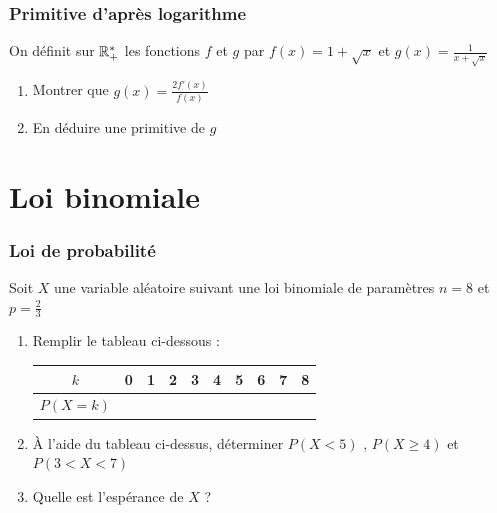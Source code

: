 \documentclass[oneside,12pt]{book}          %
\begin{document}
\subsection{Primitive d'après logarithme}
On définit sur ${\mathbb R}_+^*$ les fonctions $f$ et $g$ par $f(x)=1+\sqrt{x}$ et $g(x)=\frac{1}{x+\sqrt{x}}$
\begin{enumerate}
	\item Montrer que $g(x)=\frac{2f'(x)}{f(x)}$
	\item En déduire une primitive de $g$
\end{enumerate}



\chapter{Loi binomiale}
\newpage

\subsection{Loi de probabilité}
Soit $X$ une variable aléatoire suivant une loi binomiale de paramètres $n=8$ et $p=\frac{2}{3}$

\begin{enumerate}
    \item Remplir le tableau ci-dessous :
    \begin{center}
    \renewcommand{\arraystretch}{1.5}
    \setlength{\tabcolsep}{16pt}
    \hspace{-1cm}
    \begin{tabular}{|c|c|c|c|c|c|c|c|c|c|} \hline
    $k$ & 0 & 1 & 2 & 3 & 4 & 5 & 6 & 7 & 8 \\ \hline
    $P(X=k)$ & & & & & & & & & \\ \hline 
    \end{tabular}
    \end{center}
    \item À l'aide du tableau ci-dessus, déterminer $P(X<5)$ , $P(X\geq4)$ et $P(3<X<7)$
    \item Quelle est l'espérance de $X$ ?
\end{enumerate}
\end{document}
